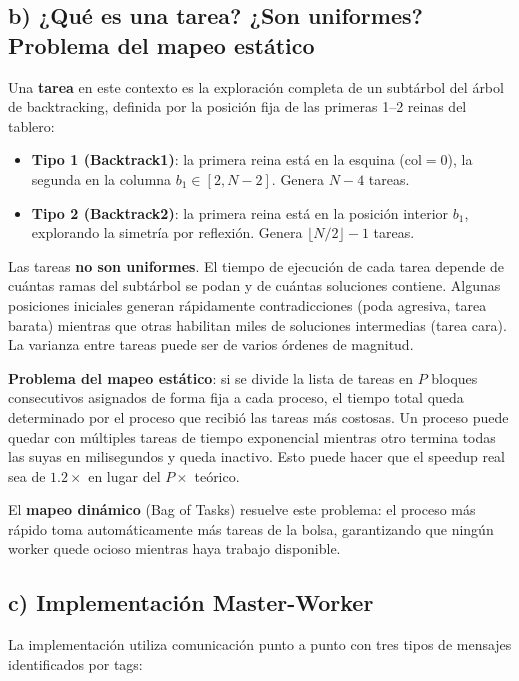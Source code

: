 \documentclass[12pt,a4paper]{article}
\begin{document}
\subsection{b) ¿Qué es una tarea? ¿Son uniformes? Problema del mapeo estático}

Una \textbf{tarea} en este contexto es la exploración completa de un subtárbol del
árbol de backtracking, definida por la posición fija de las primeras 1--2 reinas del
tablero:

\begin{itemize}
  \item \textbf{Tipo 1 (Backtrack1)}: la primera reina está en la esquina ($\text{col} = 0$),
    la segunda en la columna $b_1 \in [2, N-2]$. Genera $N-4$ tareas.
  \item \textbf{Tipo 2 (Backtrack2)}: la primera reina está en la posición interior
    $b_1$, explorando la simetría por reflexión. Genera $\lfloor N/2 \rfloor - 1$ tareas.
\end{itemize}

Las tareas \textbf{no son uniformes}. El tiempo de ejecución de cada tarea depende
de cuántas ramas del subtárbol se podan y de cuántas soluciones contiene. Algunas
posiciones iniciales generan rápidamente contradicciones (poda agresiva, tarea barata)
mientras que otras habilitan miles de soluciones intermedias (tarea cara). La varianza
entre tareas puede ser de varios órdenes de magnitud.

\textbf{Problema del mapeo estático}: si se divide la lista de tareas en $P$ bloques
consecutivos asignados de forma fija a cada proceso, el tiempo total queda determinado
por el proceso que recibió las tareas más costosas. Un proceso puede quedar con múltiples
tareas de tiempo exponencial mientras otro termina todas las suyas en milisegundos y
queda inactivo. Esto puede hacer que el speedup real sea de $1.2\times$ en lugar del
$P\times$ teórico.

El \textbf{mapeo dinámico} (Bag of Tasks) resuelve este problema: el proceso más rápido
toma automáticamente más tareas de la bolsa, garantizando que ningún worker quede ocioso
mientras haya trabajo disponible.

\subsection{c) Implementación Master-Worker}

La implementación utiliza comunicación punto a punto con tres tipos de mensajes
identificados por tags:
\end{document}
